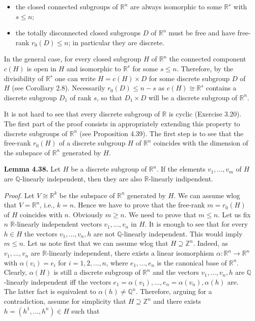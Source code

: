 \documentclass[12pt]{article}
\begin{document}
\begin{itemize}

    \item the closed connected subgroups of $\mathbb{R}^n$ are always isomorphic to some $\mathbb{R}^s$ with $s \leq n$;
    
    \item the totally disconnected closed subgroups $D$ of $\mathbb{R}^n$ must be free and have free-rank $r_0 (D) \leq n$; in particular
    they are discrete.

\end{itemize}


In the general case, for every closed subgroup $H$ of $\mathbb{R}^n$ the connected component $c(H)$ is open in $H$ and
isomorphic to $\mathbb{R}^s$ for some $s \leq n$. Therefore, by the divisibility of $\mathbb{R}^s$ one can write $H = c(H) \times D$ for some
discrete subgroup $D$ of $H$ (see Corollary 2.8). Necessarily $r_0 (D) \leq n - s$ as $c(H) \cong \mathbb{R}^s$ contains a discrete
subgroup $D_1$ of rank $s$, so that $D_1 \times D$ will be a discrete subgroup of $\mathbb{R}^n$.


It is not hard to see that every discrete subgroup of $\mathbb{R}$ is cyclic (Exercise 3.20). The first part of the proof
consists in appropriately extending this property to discrete subgroups of $\mathbb{R}^n$ (see Proposition 4.39). The first
step is to see that the free-rank $r_0 (H)$ of a discrete subgroup $H$ of $\mathbb{R}^n$ coincides with the dimension of the
subspace of $\mathbb{R}^n$ generated by $H$.


\textbf{Lemma 4.38.} Let $H$ be a discrete subgroup of $\mathbb{R}^n$. If the elements $v_1, . . . , v_m$ of $H$ are $\mathbb{Q}$-linearly independent,
then they are also $\mathbb{R}$-linearly indipendent.


\emph{Proof.} Let $V \cong \mathbb{R}^k$ be the subspace of $\mathbb{R}^n$ generated by $H$. We can assume wlog that $V = \mathbb{R}^n$, i.e., $k = n$.
Hence we have to prove that the free-rank $m = r_0 (H)$ of $H$ coincides with $n$. Obviously $m \geq n$. We need to
prove that $m \leq n$. Let us fix $n$ $\mathbb{R}$-linearly independent vectors $v_1, . . . , v_n$ in $H$. It is enough to see that for
every $h \in H$ the vectors $v_1, . . . , v_n, h$ are not $\mathbb{Q}$-linearly independent. This would imply $m \leq n$. Let us note
first that we can assume wlog that $H \supseteq \mathbb{Z}^n$. Indeed, as $v_1, . . . , v_n$ are $\mathbb{R}$-linearly independent, there exists a
linear isomorphism $\alpha : \mathbb{R}^n \to \mathbb{R}^n$ with $\alpha(v_i) = e_i$ for $i = 1, 2, . . . , n$, where $e_1, . . . , e_n$ is the canonical base of
$\mathbb{R}^n$. Clearly, $\alpha(H)$ is still a discrete subgroup of $\mathbb{R}^n$ and the vectors $v_1, . . . , v_n, h$ are $\mathbb{Q}$-linearly independent iff
the vectors $e_1 = \alpha(v_1), . . . , e_n = \alpha(v_n), \alpha(h)$ are. The latter fact is equivalent to $\alpha(h) \neq \mathbb{Q}^n$. Therefore, arguing
for a contradiction, assume for simplicity that $H \supseteq \mathbb{Z}^n$ and there exists $h = (h^1, . . . , h^n) \in H$ such that
\end{document}
